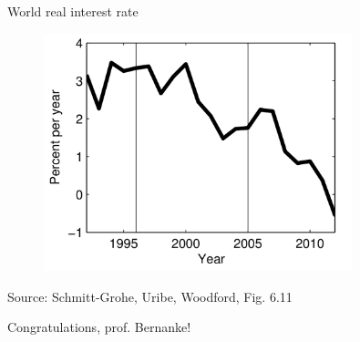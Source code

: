 \documentclass{beamer}
\begin{document}
\begin{frame}{World real interest rate}
  \begin{figure}
	\centering
	\includegraphics[width = 0.8\textwidth]{FIGURES/world_int_rate.png}
  \end{figure}
  \vspace{-0.5cm}
  \begin{minipage}{\columnwidth}
  \footnotesize
  Source: Schmitt-Grohe, Uribe, Woodford, Fig. 6.11
  \end{minipage}
  \centering
  \alert{Congratulations, prof. Bernanke!}
\end{frame}
\end{document}
